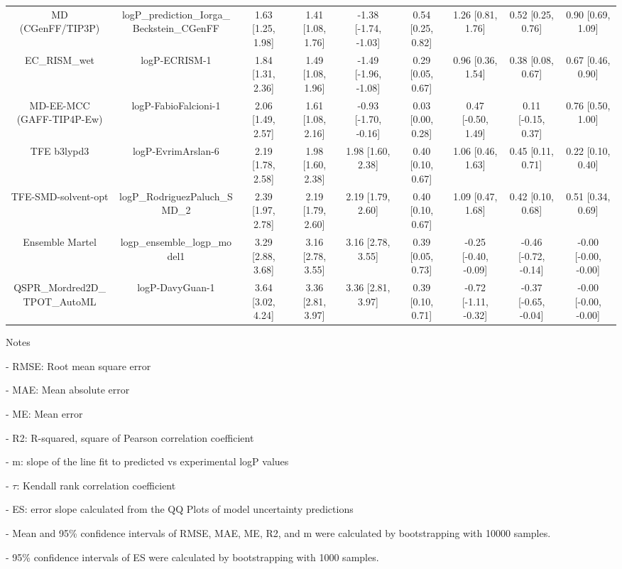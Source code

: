\documentclass{article}
\begin{document}
\begin{center}
\begin{longtable}{|ccccccccc|}
         MD (CGenFF/TIP3P) & logP\_prediction\_Iorga\_Beckstein\_CGenFF & 1.63 [1.25, 1.98] & 1.41 [1.08, 1.76] & -1.38 [-1.74, -1.03] & 0.54 [0.25, 0.82] &    1.26 [0.81, 1.76] &    0.52 [0.25, 0.76] &    0.90 [0.69, 1.09] \\
               EC_RISM_wet &                              logP-ECRISM-1 & 1.84 [1.31, 2.36] & 1.49 [1.08, 1.96] & -1.49 [-1.96, -1.08] & 0.29 [0.05, 0.67] &    0.96 [0.36, 1.54] &    0.38 [0.08, 0.67] &    0.67 [0.46, 0.90] \\
 MD-EE-MCC (GAFF-TIP4P-Ew) &                       logP-FabioFalcioni-1 & 2.06 [1.49, 2.57] & 1.61 [1.08, 2.16] & -0.93 [-1.70, -0.16] & 0.03 [0.00, 0.28] &   0.47 [-0.50, 1.49] &   0.11 [-0.15, 0.37] &    0.76 [0.50, 1.00] \\
               TFE b3lypd3 &                         logP-EvrimArslan-6 & 2.19 [1.78, 2.58] & 1.98 [1.60, 2.38] &    1.98 [1.60, 2.38] & 0.40 [0.10, 0.67] &    1.06 [0.46, 1.63] &    0.45 [0.11, 0.71] &    0.22 [0.10, 0.40] \\
       TFE-SMD-solvent-opt &              logP\_RodriguezPaluch\_SMD\_2 & 2.39 [1.97, 2.78] & 2.19 [1.79, 2.60] &    2.19 [1.79, 2.60] & 0.40 [0.10, 0.67] &    1.09 [0.47, 1.68] &    0.42 [0.10, 0.68] &    0.51 [0.34, 0.69] \\
           Ensemble Martel &               logp\_ensemble\_logp\_model1 & 3.29 [2.88, 3.68] & 3.16 [2.78, 3.55] &    3.16 [2.78, 3.55] & 0.39 [0.05, 0.73] & -0.25 [-0.40, -0.09] & -0.46 [-0.72, -0.14] & -0.00 [-0.00, -0.00] \\
QSPR_Mordred2D_TPOT_AutoML &                            logP-DavyGuan-1 & 3.64 [3.02, 4.24] & 3.36 [2.81, 3.97] &    3.36 [2.81, 3.97] & 0.39 [0.10, 0.71] & -0.72 [-1.11, -0.32] & -0.37 [-0.65, -0.04] & -0.00 [-0.00, -0.00] \\
\end{longtable}
\end{center}

Notes

- RMSE: Root mean square error

- MAE: Mean absolute error

- ME: Mean error

- R2: R-squared, square of Pearson correlation coefficient

- m: slope of the line fit to predicted vs experimental logP values

- $\tau$:  Kendall rank correlation coefficient

- ES: error slope calculated from the QQ Plots of model uncertainty predictions

- Mean and 95\% confidence intervals of RMSE, MAE, ME, R2, and m were calculated by bootstrapping with 10000 samples.

- 95\% confidence intervals of ES were calculated by bootstrapping with 1000 samples.\end{document}
\end{document}
